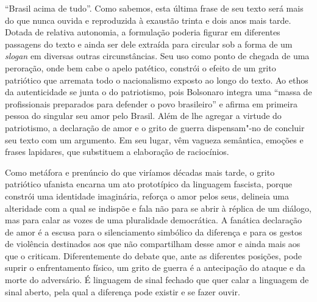 ``Brasil acima de tudo''. Como sabemos, esta última frase de seu texto
será mais do que nunca ouvida e reproduzida à exaustão trinta e dois
anos mais tarde. Dotada de relativa autonomia, a formulação poderia
figurar em diferentes passagens do texto e ainda ser dele extraída para
circular sob a forma de um \emph{slogan} em diversas outras
circunstâncias. Seu uso como ponto de chegada de uma peroração, onde bem
cabe o apelo patético, constrói o efeito de um grito patriótico que
arremata todo o nacionalismo exposto ao longo do texto. Ao ethos da
autenticidade se junta o do patriotismo, pois Bolsonaro integra uma
``massa de profissionais preparados para defender o povo brasileiro'' e
afirma em primeira pessoa do singular seu amor pelo Brasil. Além de lhe
agregar a virtude do patriotismo, a declaração de amor e o grito de
guerra dispensam"-no de concluir seu texto com um argumento. Em seu
lugar, vêm vagueza semântica, emoções e frases lapidares, que substituem
a elaboração de raciocínios.

Como metáfora e prenúncio do que viríamos décadas mais tarde, o grito
patriótico ufanista encarna um ato prototípico da linguagem fascista,
porque constrói uma identidade imaginária, reforça o amor pelos seus,
delineia uma alteridade com a qual se indispõe e fala não para se abrir
à réplica de um diálogo, mas para calar as vozes de uma pluralidade
democrática. A fanática declaração de amor é a escusa para o
silenciamento simbólico da diferença e para os gestos de violência
destinados aos que não compartilham desse amor e ainda mais aos que o
criticam. Diferentemente do debate que, ante as diferentes posições,
pode suprir o enfrentamento físico, um grito de guerra é a antecipação
do ataque e da morte do adversário. É linguagem de sinal fechado que
quer calar a linguagem de sinal aberto, pela qual a diferença pode
existir e se fazer ouvir.

